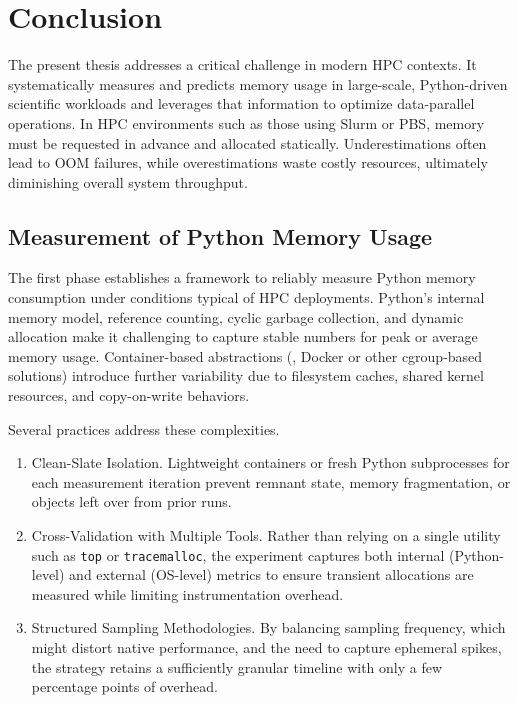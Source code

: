 \chapter{Conclusion}
\label{ch:conclusion}

The present thesis addresses a critical challenge in modern \ac{HPC} contexts.
It systematically measures and predicts memory usage in large-scale, Python-driven scientific workloads and leverages that information to optimize data-parallel operations.
In \ac{HPC} environments such as those using Slurm or \ac{PBS}, memory must be requested in advance and allocated statically.
Underestimations often lead to \ac{OOM} failures, while overestimations waste costly resources, ultimately diminishing overall system throughput.


\section{Measurement of Python Memory Usage}
\label{sec:conc-measurement}

The first phase establishes a framework to reliably measure Python memory consumption under conditions typical of \ac{HPC} deployments.
Python's internal memory model, reference counting, cyclic garbage collection, and dynamic allocation make it challenging to capture stable numbers for peak or average memory usage.
Container-based abstractions (\eg, Docker or other \ac{cgroup}-based solutions) introduce further variability due to filesystem caches, shared kernel resources, and copy-on-write behaviors.

Several practices address these complexities.
\begin{enumerate}
    \item Clean-Slate Isolation.
    Lightweight containers or fresh Python subprocesses for each measurement iteration prevent remnant state, memory fragmentation, or objects left over from prior runs.
    \item Cross-Validation with Multiple Tools.
    Rather than relying on a single utility such as \texttt{top} or \texttt{tracemalloc}, the experiment captures both internal (Python-level) and external (\ac{OS}-level) metrics to ensure transient allocations are measured while limiting instrumentation overhead.
    \item Structured Sampling Methodologies.
    By balancing sampling frequency, which might distort native performance, and the need to capture ephemeral spikes, the strategy retains a sufficiently granular timeline with only a few percentage points of overhead.
\end{enumerate}

